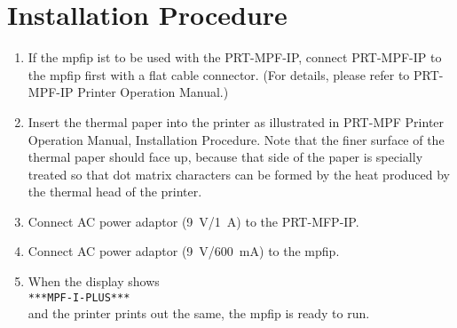 \clearpage

\section{Installation Procedure}

\begin{enumerate}[label=\arabic*), leftmargin=*, parsep=0em]
    \item If the \gls{mpfip} ist to be used with the PRT-MPF-IP, connect PRT-MPF-IP to the \gls{mpfip} first with a flat cable connector.
    (For details, please refer to PRT-MPF-IP Printer Operation Manual.)
    \item Insert the thermal paper into the printer as illustrated in PRT-MPF Printer Operation Manual, \MakeUppercase{} Installation Procedure.
    Note that the finer surface of the thermal paper should face up, because that side of the paper is specially treated so that dot matrix characters can be formed by the heat produced by the thermal head of the printer.
    \item Connect AC power adaptor (\SI{9}{\V}/\SI{1}{\A}) to the PRT-MFP-IP.
    \item Connect AC power adaptor (\SI{9}{\V}/\SI{600}{\mA}) to the \gls{mpfip}.
    \item When the display shows\\
    \texttt{***MPF-I-PLUS***}\\
    and the printer prints out the same, the \gls{mpfip} is ready to run.
\end{enumerate}

\clearpage